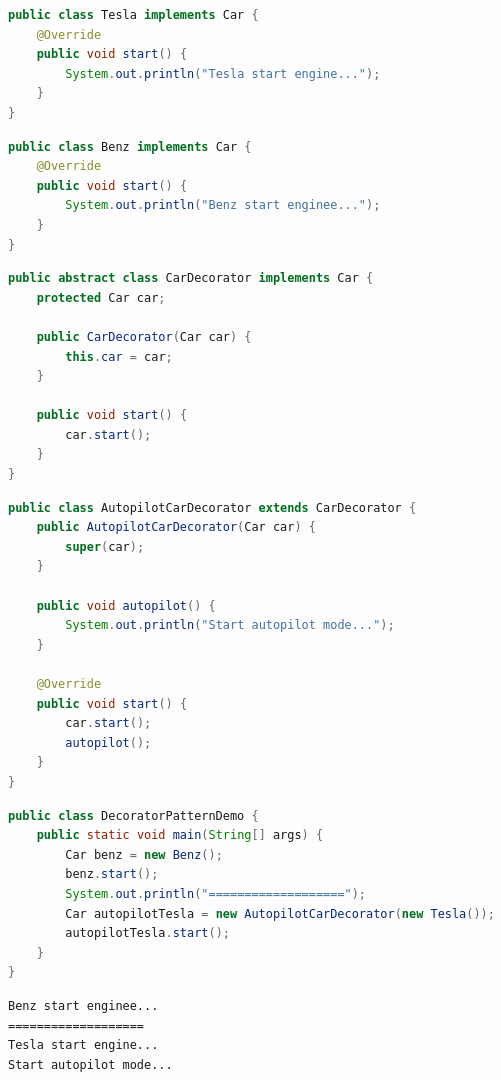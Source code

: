 \begin{lstlisting}[language=Java, title=Tesla.java]
public class Tesla implements Car {
    @Override
    public void start() {
        System.out.println("Tesla start engine...");
    }
}
\end{lstlisting}

\begin{lstlisting}[language=Java, title=Benz.java]
public class Benz implements Car {
    @Override
    public void start() {
        System.out.println("Benz start enginee...");
    }
}
\end{lstlisting}

\begin{lstlisting}[language=Java, title=CarDecorator.java]
public abstract class CarDecorator implements Car {
    protected Car car;

    public CarDecorator(Car car) {
        this.car = car;
    }

    public void start() {
        car.start();
    }
}
\end{lstlisting}

\begin{lstlisting}[language=Java, title=AutopilotCarDecorator.java]
public class AutopilotCarDecorator extends CarDecorator {
    public AutopilotCarDecorator(Car car) {
        super(car);
    }

    public void autopilot() {
        System.out.println("Start autopilot mode...");
    }

    @Override
    public void start() {
        car.start();
        autopilot();
    }
}
\end{lstlisting}

\begin{lstlisting}[language=Java, title=DecoratorPatternDemo.java]
public class DecoratorPatternDemo {
    public static void main(String[] args) {
        Car benz = new Benz();
        benz.start();
        System.out.println("===================");
        Car autopilotTesla = new AutopilotCarDecorator(new Tesla());
        autopilotTesla.start();
    }
}
\end{lstlisting}

\begin{tcolorbox}
    \begin{verbatim}
Benz start enginee...
===================
Tesla start engine...
Start autopilot mode...
\end{verbatim}
\end{tcolorbox}

